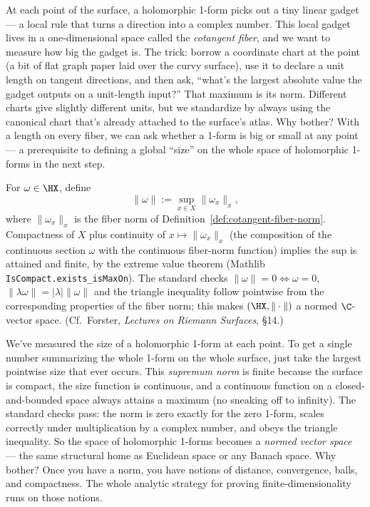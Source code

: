 \begin{layman}
At each point of the surface, a holomorphic 1-form picks out a tiny
linear gadget — a local rule that turns a direction into a complex number.
This local gadget lives in a one-dimensional space called the
\emph{cotangent fiber}, and we want to measure how big the gadget is.
The trick: borrow a coordinate chart at the point (a bit of flat graph
paper laid over the curvy surface), use it to declare a unit length on
tangent directions, and then ask, ``what's the largest absolute value the
gadget outputs on a unit-length input?'' That maximum is its norm.
Different charts give slightly different units, but we standardize by
always using the canonical chart that's already attached to the surface's
atlas. Why bother? With a length on every fiber, we can ask whether a
1-form is big or small at any point — a prerequisite to defining a global
``size'' on the whole space of holomorphic 1-forms in the next step.
\end{layman}

\begin{definition}
\label{def:holomorphic-sup-norm}
For \(\omega\in\HX\), define
\[
  \|\omega\| := \sup_{x\in X}\|\omega_x\|_{x},
\]
where \(\|\omega_x\|_{x}\) is the fiber norm of
Definition~\ref{def:cotangent-fiber-norm}. Compactness of \(X\) plus
continuity of \(x \mapsto \|\omega_x\|_{x}\) (the composition of the
continuous section \(\omega\) with the continuous fiber-norm function)
implies the sup is attained and finite, by the extreme value theorem
(Mathlib \texttt{IsCompact.exists\_isMaxOn}). The standard checks
\(\|\omega\|=0\iff \omega=0\), \(\|\lambda\omega\|=|\lambda|\|\omega\|\)
and the triangle inequality follow pointwise from the corresponding
properties of the fiber norm; this makes \((\HX,\|\cdot\|)\) a normed
\(\C\)-vector space. (Cf.\ Forster, \emph{Lectures on Riemann
Surfaces}, \S 14.)
\leanok
\end{definition}

\begin{layman}
We've measured the size of a holomorphic 1-form at each point. To get a
single number summarizing the whole 1-form on the whole surface, just
take the largest pointwise size that ever occurs. This \emph{supremum
norm} is finite because the surface is compact, the size function is
continuous, and a continuous function on a closed-and-bounded space
always attains a maximum (no sneaking off to infinity). The standard
checks pass: the norm is zero exactly for the zero 1-form, scales
correctly under multiplication by a complex number, and obeys the
triangle inequality. So the space of holomorphic 1-forms becomes a
\emph{normed vector space} — the same structural home as Euclidean space
or any Banach space. Why bother? Once you have a norm, you have notions
of distance, convergence, balls, and compactness. The whole analytic
strategy for proving finite-dimensionality runs on those notions.
\end{layman}

